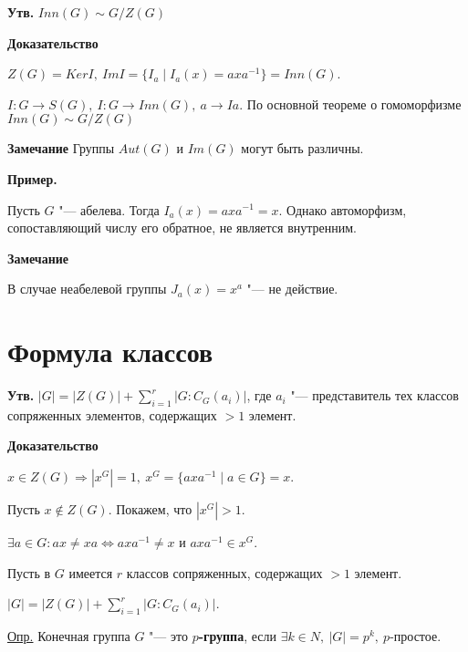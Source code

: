\documentclass{article}
\begin{document}
\vspace{10pt}

\textbf{Утв.}
$Inn(G) \sim G/Z(G)$

\vspace{5pt}

\textbf{Доказательство}

$Z(G) = KerI, \  ImI = \{I_a \mid I_a(x) = axa^{-1}\} =  Inn(G)$.

$I: G \rightarrow S(G), \  I: G \rightarrow Inn(G), \  a \rightarrow Ia$. По основной теореме о гомоморфизме $Inn(G) \sim G/Z(G)$

\vspace{5pt}

\textbf{Замечание} Группы $Aut(G)$ и $Im(G)$ могут быть различны.

\textbf{Пример.}

Пусть $G$ "--- абелева. Тогда $I_a(x) = axa^{-1} = x$. Однако автоморфизм, сопоставляющий числу его обратное, не является внутренним.

\vspace{5pt}

\textbf{Замечание}

В случае неабелевой группы $J_a(x) = x^a$ "--- не действие.

\section{Формула классов}

\textbf{Утв.}
$|G| = |Z(G)| + \sum \limits_{i = 1}^r |G:C_G(a_i)|$, где $a_i$ "--- представитель тех классов сопряженных элементов, содержащих $> 1$ элемент.

\vspace{5pt}

\textbf{Доказательство}

$x \in Z(G) \Rightarrow |x^G| = 1, \  x^G = \{axa^{-1} \mid a \in G\} = x$.

Пусть $x \notin Z(G)$. Покажем, что $|x^G| > 1$.

$\exists a \in G: ax \neq xa \Leftrightarrow axa^{-1} \neq x$ и $axa^{-1} \in x^G$.

Пусть в $G$ имеется $r$ классов сопряженных, содержащих $> 1$ элемент.

$|G| = |Z(G)| + \sum \limits_{i = 1}^r |G:C_G(a_i)|$. 

\vspace{10pt}

\underline{Опр.} Конечная группа $G$ "--- это \textbf{$p$-группа}, если $\exists k \in N, \  |G| = p^k, \  p$-простое.
\end{document}
